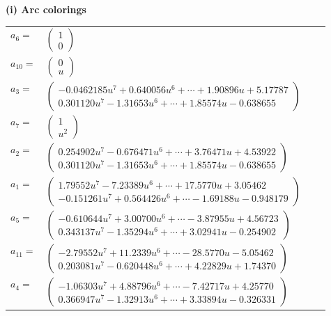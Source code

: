 \documentclass[1p]{elsarticle_modified}
\theoremstyle{definition}
\begin{document}
\flushleft \textbf{(i) Arc colorings}\\
\begin{tabular}{m{7pt} m{180pt} m{7pt} m{180pt} }
\flushright $a_{6}=$&$\begin{pmatrix}1\\0\end{pmatrix}$ \\
\flushright $a_{10}=$&$\begin{pmatrix}0\\u\end{pmatrix}$ \\
\flushright $a_{3}=$&$\begin{pmatrix}-0.0462185 u^{7}+0.640056 u^{6}+\cdots+1.90896 u+5.17787\\0.301120 u^{7}-1.31653 u^{6}+\cdots+1.85574 u-0.638655\end{pmatrix}$ \\
\flushright $a_{7}=$&$\begin{pmatrix}1\\u^2\end{pmatrix}$ \\
\flushright $a_{2}=$&$\begin{pmatrix}0.254902 u^{7}-0.676471 u^{6}+\cdots+3.76471 u+4.53922\\0.301120 u^{7}-1.31653 u^{6}+\cdots+1.85574 u-0.638655\end{pmatrix}$ \\
\flushright $a_{1}=$&$\begin{pmatrix}1.79552 u^{7}-7.23389 u^{6}+\cdots+17.5770 u+3.05462\\-0.151261 u^{7}+0.564426 u^{6}+\cdots-1.69188 u-0.948179\end{pmatrix}$ \\
\flushright $a_{5}=$&$\begin{pmatrix}-0.610644 u^{7}+3.00700 u^{6}+\cdots-3.87955 u+4.56723\\0.343137 u^{7}-1.35294 u^{6}+\cdots+3.02941 u-0.254902\end{pmatrix}$ \\
\flushright $a_{11}=$&$\begin{pmatrix}-2.79552 u^{7}+11.2339 u^{6}+\cdots-28.5770 u-5.05462\\0.203081 u^{7}-0.620448 u^{6}+\cdots+4.22829 u+1.74370\end{pmatrix}$ \\
\flushright $a_{4}=$&$\begin{pmatrix}-1.06303 u^{7}+4.88796 u^{6}+\cdots-7.42717 u+4.25770\\0.366947 u^{7}-1.32913 u^{6}+\cdots+3.33894 u-0.326331\end{pmatrix}$ \\

\end{tabular}
\end{document}
